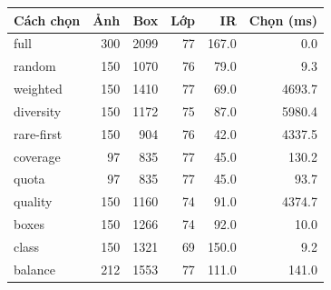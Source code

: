\begin{tabular}{lrrrrr}
\toprule
Cách chọn & Ảnh & Box & Lớp & IR & Chọn (ms) \\
\midrule
full & 300 & 2099 & 77 & 167.0 & 0.0 \\
random & 150 & 1070 & 76 & 79.0 & 9.3 \\
weighted & 150 & 1410 & 77 & 69.0 & 4693.7 \\
diversity & 150 & 1172 & 75 & 87.0 & 5980.4 \\
rare-first & 150 & 904 & 76 & 42.0 & 4337.5 \\
coverage & 97 & 835 & 77 & 45.0 & 130.2 \\
quota & 97 & 835 & 77 & 45.0 & 93.7 \\
quality & 150 & 1160 & 74 & 91.0 & 4374.7 \\
boxes & 150 & 1266 & 74 & 92.0 & 10.0 \\
class & 150 & 1321 & 69 & 150.0 & 9.2 \\
balance & 212 & 1553 & 77 & 111.0 & 141.0 \\
\bottomrule
\end{tabular}
